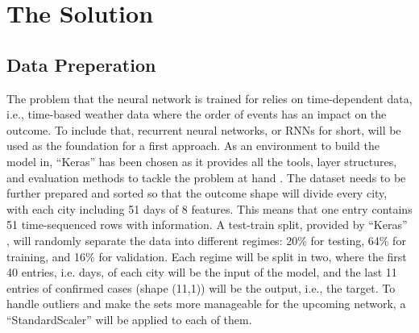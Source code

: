 \section{The Solution}
\subsection{Data Preperation}
The problem that the neural network is trained for relies on time-dependent data, i.e., time-based weather data where the order of events
has an impact on the outcome. To include that, recurrent neural networks, or RNNs for short, will be used as the foundation for a first approach.
As an environment to build the model in, \enquote{Keras} has been chosen as it provides all the tools, layer structures, and evaluation methods
to tackle the problem at hand \cite{keras}. The dataset needs to be further prepared and sorted so that the outcome shape will divide every city, with each city including 51 days of 8 features.
This means that one entry contains 51 time-sequenced rows with information. A test-train split, provided by \enquote{Keras} \cite{keras}, will
randomly separate the data into different regimes: 20\% for testing, 64\% for training, and 16\% for validation. Each regime will be split in two, where the first 40 entries, i.e. days, of each city
will be the input of the model, and the last 11 entries of confirmed cases (shape (11,1)) will be the output, i.e., the target.
To handle outliers and make the sets more manageable for the upcoming network, a \enquote{StandardScaler} \cite{keras} will be applied to each of them.

